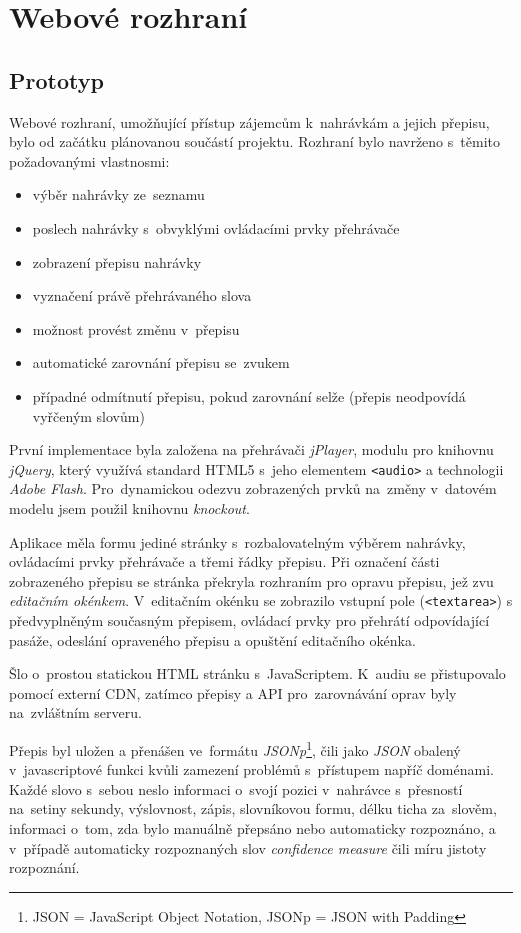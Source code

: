 \chapter{Webové rozhraní}
\label{kap:webove-rozhrani}

\section{Prototyp}

Webové rozhraní, umožňující přístup zájemcům k~nahrávkám a jejich přepisu, bylo
od začátku plánovanou součástí projektu. Rozhraní bylo navrženo s~těmito
požadovanými vlastnosmi:

\begin{itemize}
\item{výběr nahrávky ze~seznamu}
\item{poslech nahrávky s~obvyklými ovládacími prvky přehrávače}
\item{zobrazení přepisu nahrávky}
\item{vyznačení právě přehrávaného slova}
\item{možnost provést změnu v~přepisu}
\item{automatické zarovnání přepisu se~zvukem}
\item{případné odmítnutí přepisu, pokud zarovnání selže (přepis neodpovídá
vyřčeným slovům)}
\end{itemize}

První implementace byla založena na přehrávači \textit{jPlayer}, modulu pro
knihovnu \textit{jQuery}, který využívá standard HTML5 s~jeho elementem
\texttt{<audio>} a technologii \textit{Adobe Flash}. Pro~dynamickou odezvu
zobrazených prvků na~změny v~datovém modelu jsem použil knihovnu
\textit{knockout}.

Aplikace měla formu jediné stránky s~rozbalovatelným výběrem nahrávky,
ovládacími prvky přehrávače a třemi řádky přepisu. Při označení části
zobrazeného přepisu se stránka překryla rozhraním pro opravu přepisu, jež zvu
\textit{editačním okénkem}. V~editačním okénku se zobrazilo vstupní pole
(\texttt{<textarea>}) s předvyplněným současným přepisem, ovládací prvky pro
přehrátí odpovídající pasáže, odeslání opraveného přepisu a opuštění editačního
okénka.

Šlo o~prostou statickou HTML stránku s~JavaScriptem. K~audiu se přistupovalo
pomocí externí CDN, zatímco přepisy a API pro~zarovnávání oprav byly
na~zvláštním serveru.

Přepis byl uložen a přenášen ve~formátu \textit{JSONp}\footnote{JSON =
JavaScript Object Notation, JSONp = JSON with Padding}, čili jako \textit{JSON}
obalený v~javascriptové funkci kvůli zamezení problémů s~přístupem napříč
doménami.  Každé slovo s~sebou neslo informaci o~svojí pozici v~nahrávce
s~přesností na~setiny sekundy, výslovnost, zápis, slovníkovou formu, délku ticha
za~slověm, informaci o~tom, zda bylo manuálně přepsáno nebo automaticky
rozpoznáno, a v~případě automaticky rozpoznaných slov \textit{confidence
measure} čili míru jistoty rozpoznání.


